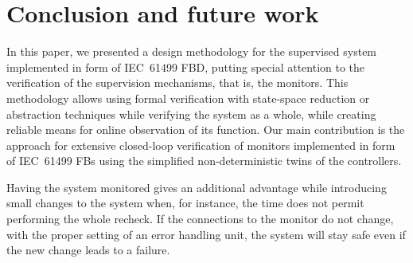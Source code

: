 \documentclass[conference]{IEEEtran}
\begin{document}
%
%
%
%
%
%

\section{Conclusion and future work}
\label{sec:concl}

In this paper, we presented a design methodology for the supervised system implemented in form of IEC~61499 FBD, putting special attention to the verification of the supervision mechanisms, that is, the monitors. This methodology allows using formal verification with state-space reduction or abstraction techniques while verifying the system as a whole, while creating reliable means for online observation of its function. Our main contribution is the approach for extensive closed-loop verification of monitors implemented in form of IEC~61499 FBs using the simplified non-deterministic twins of the controllers.

Having the system monitored gives an additional advantage while introducing small changes to the system when, for instance, the time does not permit performing the whole recheck. If the connections to the monitor do not change, with the proper setting of an error handling unit, the system will stay safe even if the new change leads to a failure.
\end{document}
